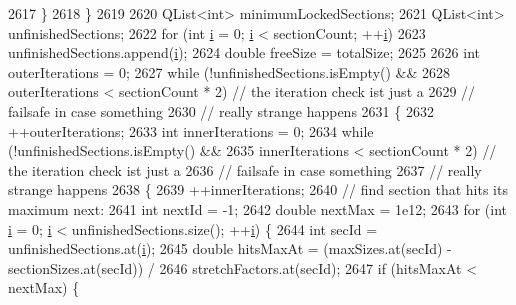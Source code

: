 \begin{DoxyCode}
2617     \}
2618   \}
2619 
2620   QList<int> minimumLockedSections;
2621   QList<int> unfinishedSections;
2622   \textcolor{keywordflow}{for} (\textcolor{keywordtype}{int} \hyperlink{_comparision_pictures_2_createtest_image_8m_a6f6ccfcf58b31cb6412107d9d5281426}{i} = 0; \hyperlink{_comparision_pictures_2_createtest_image_8m_a6f6ccfcf58b31cb6412107d9d5281426}{i} < sectionCount; ++\hyperlink{_comparision_pictures_2_createtest_image_8m_a6f6ccfcf58b31cb6412107d9d5281426}{i})
2623     unfinishedSections.append(\hyperlink{_comparision_pictures_2_createtest_image_8m_a6f6ccfcf58b31cb6412107d9d5281426}{i});
2624   \textcolor{keywordtype}{double} freeSize = totalSize;
2625 
2626   \textcolor{keywordtype}{int} outerIterations = 0;
2627   \textcolor{keywordflow}{while} (!unfinishedSections.isEmpty() &&
2628          outerIterations < sectionCount * 2) \textcolor{comment}{// the iteration check ist just a}
2629                                              \textcolor{comment}{// failsafe in case something}
2630                                              \textcolor{comment}{// really strange happens}
2631   \{
2632     ++outerIterations;
2633     \textcolor{keywordtype}{int} innerIterations = 0;
2634     \textcolor{keywordflow}{while} (!unfinishedSections.isEmpty() &&
2635            innerIterations < sectionCount * 2) \textcolor{comment}{// the iteration check ist just a}
2636                                                \textcolor{comment}{// failsafe in case something}
2637                                                \textcolor{comment}{// really strange happens}
2638     \{
2639       ++innerIterations;
2640       \textcolor{comment}{// find section that hits its maximum next:}
2641       \textcolor{keywordtype}{int} nextId = -1;
2642       \textcolor{keywordtype}{double} nextMax = 1e12;
2643       \textcolor{keywordflow}{for} (\textcolor{keywordtype}{int} \hyperlink{_comparision_pictures_2_createtest_image_8m_a6f6ccfcf58b31cb6412107d9d5281426}{i} = 0; \hyperlink{_comparision_pictures_2_createtest_image_8m_a6f6ccfcf58b31cb6412107d9d5281426}{i} < unfinishedSections.size(); ++\hyperlink{_comparision_pictures_2_createtest_image_8m_a6f6ccfcf58b31cb6412107d9d5281426}{i}) \{
2644         \textcolor{keywordtype}{int} secId = unfinishedSections.at(\hyperlink{_comparision_pictures_2_createtest_image_8m_a6f6ccfcf58b31cb6412107d9d5281426}{i});
2645         \textcolor{keywordtype}{double} hitsMaxAt = (maxSizes.at(secId) - sectionSizes.at(secId)) /
2646                            stretchFactors.at(secId);
2647         \textcolor{keywordflow}{if} (hitsMaxAt < nextMax) \{

\end{DoxyCode}
